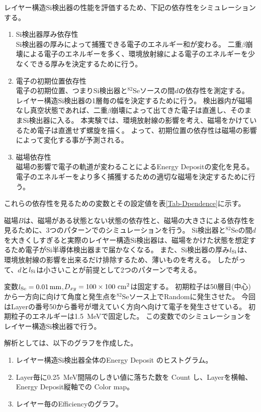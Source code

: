 \documentclass[a4paper,10pt]{jreport}
\begin{document}
レイヤー構造Si検出器の性能を評価するため、下記の依存性をシミュレーションする。

\begin{enumerate}
	\item Si検出器厚み依存性 \\
	Si検出器の厚みによって捕獲できる電子のエネルギー和が変わる。
	二重$\beta$崩壊による電子のエネルギーを多く、環境放射線による電子のエネルギーを少なくできる厚みを決定するために行う。
	
	\item 電子の初期位置依存性 \\
	電子の初期位置、つまりSi検出器と$^{82}$Seソースの間$d$の依存性を測定する。
	レイヤー構造Si検出器の1層毎の幅を決定するために行う。
	検出器内が磁場なし真空状態であれば、二重$\beta$崩壊によって出てきた電子は直進し、そのままSi検出器に入る。
	本実験では、環境放射線の影響を考え、磁場をかけているため電子は直進せず螺旋を描く。
	よって、初期位置の依存性は磁場の影響によって変化する事が予測される。
	
	\item 磁場依存性 \\
	磁場の影響で電子の軌道が変わることによるEnergy Depositの変化を見る。
	電子のエネルギーをより多く捕獲するための適切な磁場を決定するために行う。
\end{enumerate}

これらの依存性を見るための変数とその設定値を表\ref{Tab-Dpendence}に示す。

磁場$B$は、磁場がある状態とない状態の依存性と、磁場の大きさによる依存性を見るために、3つのパターンでのシミュレーションを行う。
Si検出器と$^{82}$Seの間$d$を大きくしすぎると実際のレイヤー構造Si検出器は、磁場をかけた状態を想定するため電子がSi半導体検出器まで届かなくなる。
また、Si検出器の厚み$l_{\rm{Si}}$は、環境放射線の影響を出来るだけ排除するため、薄いものを考える。
したがって、$d$と$l_{\rm{Si}}$は小さいことが前提として2つのパターンで考える。

変数$l_{\rm{Se}} = \SI{0.01}{mm}$,$D_{xy} =100\times100\ \rm{cm}^2$は固定する。
初期粒子は50層目(中心)から一方向に向けて角度と発生点を$^{82}$Seソース上でRandomに発生させた。
今回はLayerの番号50から番号が増えていく方向へ向けて電子を発生させている。
初期粒子のエネルギーは\SI{1.5}{MeV}で固定した。
この変数でのシミュレーションをレイヤー構造Si検出器で行う。

解析としては、以下のグラフを作成した。

\begin{enumerate}
	\item レイヤー構造Si検出器全体のEnergy Deposit のヒストグラム。
	\item  Layer毎に\SI{0.25}{MeV}間隔のしきい値に落ちた数を Count し、Layerを横軸、Energy Deposit縦軸での Color map。
	\item レイヤー毎のEfficiencyのグラフ。
\end{enumerate}
\end{document}
